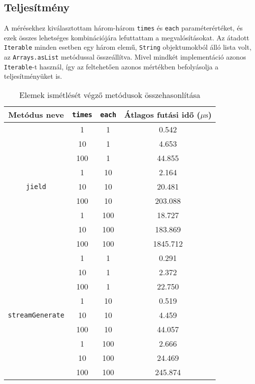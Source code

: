 \subsection{Teljesítmény}

A mérésekhez kiválasztottam három-három \texttt{times} és \texttt{each} paraméterértéket, és ezek összes lehetséges kombinációjára lefuttattam a megvalósításokat. Az átadott \texttt{Iterable} minden esetben egy három elemű, \texttt{String} objektumokból álló lista volt, az \texttt{Arrays.asList} metódussal összeállítva. Mivel mindkét implementáció azonos \texttt{Iterable}-t használ, így az feltehetően azonos mértékben befolyásolja a teljesítményüket is.

\begin{table}[h]
\captionsetup{justification=centering}
\centering
  \begin{tabular}{|| c | c | c | c ||}
  \hline
  Metódus neve & \texttt{times} & \texttt{each} & Átlagos futási idő ($\mu\mathrm{s}$) \\
  \hline \hline
  \multirow{9}{8.8em}{\texttt{jield}} & 1 & 1 & 0.542  \\
  & 10 & 1 & 4.653  \\
  & 100 & 1 & 44.855  \\
  & 1 & 10 & 2.164  \\
  & 10 & 10 & 20.481  \\
  & 100 & 10 & 203.088  \\
  & 1 & 100 & 18.727 \\
  & 10 & 100 & 183.869  \\
  & 100 & 100 & 1845.712 \\
  \hline
  \multirow{9}{8.8em}{\texttt{streamGenerate}} & 1 & 1 & 0.291  \\
  & 10 & 1 & 2.372  \\
  & 100 & 1 & 22.750  \\
  & 1 & 10 & 0.519  \\
  & 10 & 10 & 4.459  \\
  & 100 & 10 & 44.057  \\
  & 1 & 100 & 2.666  \\
  & 10 & 100 & 24.469  \\
  & 100 & 100 & 245.874  \\
  \hline
  \end{tabular}
\caption{Elemek ismétlését végző metódusok összehasonlítása}  
\label{table:repComp}
\end{table}

\pagebreak

